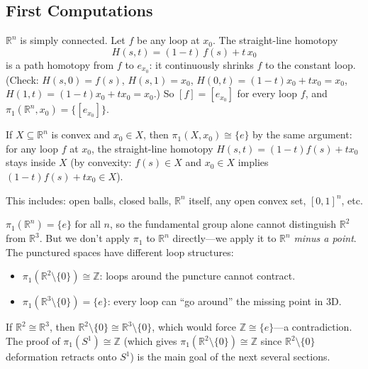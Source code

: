 \documentclass[11pt]{report}
\begin{document}
\subsection{First Computations}

\begin{exbox}
$\mathbb{R}^n$ is simply connected. Let $f$ be any loop at $x_0$. The straight-line homotopy
\[H(s, t) = (1 - t)\,f(s) + t\,x_0\]
is a path homotopy from $f$ to $e_{x_0}$: it continuously shrinks $f$ to the constant loop. (Check: $H(s,0) = f(s)$, $H(s,1) = x_0$, $H(0,t) = (1-t)x_0 + tx_0 = x_0$, $H(1,t) = (1-t)x_0 + tx_0 = x_0$.) So $[f] = [e_{x_0}]$ for every loop $f$, and $\pi_1(\mathbb{R}^n, x_0) = \{[e_{x_0}]\}$.
\end{exbox}

\begin{exbox}
If $X \subseteq \mathbb{R}^n$ is convex and $x_0 \in X$, then $\pi_1(X, x_0) \cong \{e\}$ by the same argument: for any loop $f$ at $x_0$, the straight-line homotopy $H(s,t) = (1-t)f(s) + tx_0$ stays inside $X$ (by convexity: $f(s) \in X$ and $x_0 \in X$ implies $(1-t)f(s) + tx_0 \in X$).

This includes: open balls, closed balls, $\mathbb{R}^n$ itself, any open convex set, $[0,1]^n$, etc.
\end{exbox}

\begin{rembox}
$\pi_1(\mathbb{R}^n) = \{e\}$ for all $n$, so the fundamental group alone cannot distinguish $\mathbb{R}^2$ from $\mathbb{R}^3$. But we don't apply $\pi_1$ to $\mathbb{R}^n$ directly---we apply it to $\mathbb{R}^n$ \emph{minus a point}. The punctured spaces have different loop structures:
\begin{itemize}[nosep]
    \item $\pi_1(\mathbb{R}^2 \setminus \{0\}) \cong \mathbb{Z}$: loops around the puncture cannot contract.
    \item $\pi_1(\mathbb{R}^3 \setminus \{0\}) = \{e\}$: every loop can ``go around'' the missing point in 3D.
\end{itemize}
If $\mathbb{R}^2 \cong \mathbb{R}^3$, then $\mathbb{R}^2 \setminus \{0\} \cong \mathbb{R}^3 \setminus \{0\}$, which would force $\mathbb{Z} \cong \{e\}$---a contradiction. The proof of $\pi_1(S^1) \cong \mathbb{Z}$ (which gives $\pi_1(\mathbb{R}^2 \setminus \{0\}) \cong \mathbb{Z}$ since $\mathbb{R}^2 \setminus \{0\}$ deformation retracts onto $S^1$) is the main goal of the next several sections.
\end{rembox}
\end{document}
